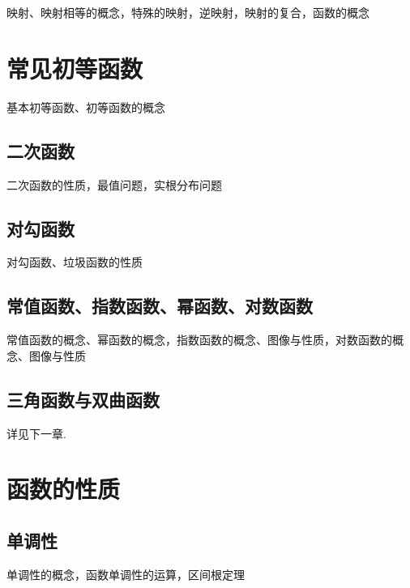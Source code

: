 \documentclass[lang=cn, zihao=4.5]{elegantbook}
\begin{document}
映射、映射相等的概念，特殊的映射，逆映射，映射的复合，函数的概念

\section{常见初等函数}


基本初等函数、初等函数的概念

\subsection{二次函数}

二次函数的性质，最值问题，实根分布问题

\subsection{对勾函数}

对勾函数、垃圾函数的性质

\subsection{常值函数、指数函数、幂函数、对数函数}

常值函数的概念、幂函数的概念，指数函数的概念、图像与性质，对数函数的概念、图像与性质

\subsection{三角函数与双曲函数}

详见下一章.

\section{函数的性质}

\subsection{单调性}

单调性的概念，函数单调性的运算，区间根定理
\end{document}

